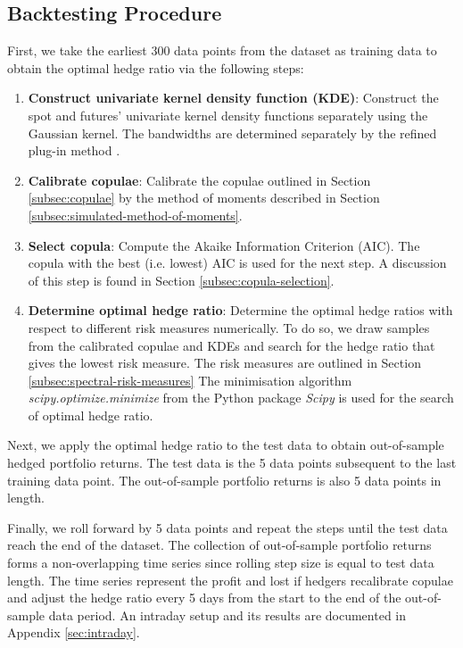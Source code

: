 \subsection{Backtesting Procedure}\label{sec:empirical-procedure}
First, we take the earliest 300 data points from the dataset 
as training data to obtain the optimal hedge ratio via the following steps:

\begin{enumerate}
\item \textbf{Construct univariate kernel density function (KDE)}:
  Construct the spot and futures' univariate kernel density functions separately
  using the Gaussian kernel. The bandwidths are determined separately by the refined plug-in method \citep[Section
  3.3.3]{hardle2004nonparametric}.
\item \textbf{Calibrate copulae}:
  Calibrate the copulae outlined in Section \ref{subsec:copulae} by the
  method of moments described in Section \ref{subsec:simulated-method-of-moments}.
\item \textbf{Select copula}:
  Compute the Akaike Information Criterion (AIC). The copula with the
  best (i.e. lowest) AIC is used for the next step. 
  A discussion of this step is found in Section \ref{subsec:copula-selection}.
\item \textbf{Determine optimal hedge ratio}:
  Determine the optimal hedge ratios with respect to different
  risk measures numerically. 
  To do so, we draw samples from the calibrated copulae and KDEs 
  and search for the hedge ratio that gives the lowest risk measure. 
  The risk measures are outlined in Section \ref{subsec:spectral-risk-measures} 
  The minimisation algorithm \textit{scipy.optimize.minimize} from the Python package {\em Scipy} \citep{2020SciPy-NMeth} is used for the search of optimal hedge ratio.
\end{enumerate}

Next, we apply the optimal hedge ratio to the test data to obtain out-of-sample hedged portfolio returns.
The test data is the 5 data points subsequent to the last training data point. 
The out-of-sample portfolio returns is also 5 data points in length.

Finally, we roll forward by 5 data points and repeat the steps until the test data reach the end of the dataset. 
The collection of out-of-sample portfolio returns forms a non-overlapping time series since rolling step size is equal to test data length.
The time series represent the profit and lost if hedgers recalibrate copulae and adjust the hedge ratio every 5 days from the start to the end of the out-of-sample data period.
An intraday setup and its results are documented in Appendix \ref{sec:intraday}. 

